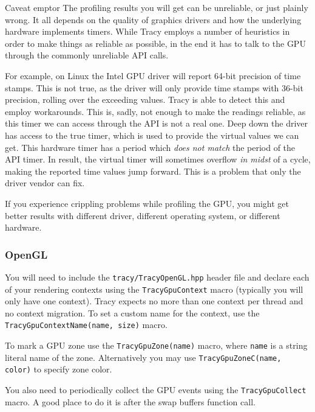 \documentclass[hidelinks,titlepage,a4paper]{article}
\begin{document}
\begin{bclogo}[
noborder=true,
couleur=black!5,
logo=\bcattention
]{Caveat emptor}
The profiling results you will get can be unreliable, or just plainly wrong. It all depends on the quality of graphics drivers and how the underlying hardware implements timers. While Tracy employs a number of heuristics in order to make things as reliable as possible, in the end it has to talk to the GPU through the commonly unreliable API calls.

For example, on Linux the Intel GPU driver will report 64-bit precision of time stamps. This is not true, as the driver will only provide time stamps with 36-bit precision, rolling over the exceeding values. Tracy is able to detect this and employ workarounds. This is, sadly, not enough to make the readings reliable, as this timer we can access through the API is not a real one. Deep down the driver has access to the true timer, which is used to provide the virtual values we can get. This hardware timer has a period which \emph{does not match} the period of the API timer. In result, the virtual timer will sometimes overflow \emph{in midst} of a cycle, making the reported time values jump forward. This is a problem that only the driver vendor can fix.

If you experience crippling problems while profiling the GPU, you might get better results with different driver, different operating system, or different hardware.
\end{bclogo}

\subsubsection{OpenGL}

You will need to include the \texttt{tracy/TracyOpenGL.hpp} header file and declare each of your rendering contexts using the \texttt{TracyGpuContext} macro (typically you will only have one context). Tracy expects no more than one context per thread and no context migration. To set a custom name for the context, use the \texttt{TracyGpuContextName(name, size)} macro.

To mark a GPU zone use the \texttt{TracyGpuZone(name)} macro, where \texttt{name} is a string literal name of the zone. Alternatively you may use \texttt{TracyGpuZoneC(name, color)} to specify zone color.

You also need to periodically collect the GPU events using the \texttt{TracyGpuCollect} macro. A good place to do it is after the swap buffers function call.
\end{document}
